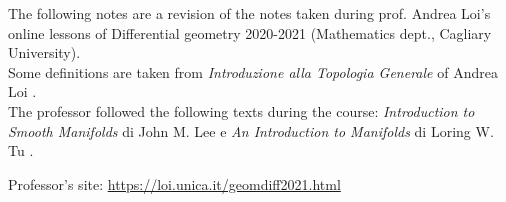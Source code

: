 The following notes are a revision of the notes taken during prof. Andrea Loi's online lessons of Differential geometry 2020-2021 (Mathematics dept., Cagliary University). \\
Some definitions are taken from \textit{Introduzione alla Topologia Generale} of Andrea Loi \autocite{loi}. \\
The professor followed the following texts during the course: \textit{Introduction to Smooth Manifolds} di John M. Lee \cite{lee} e \textit{An Introduction to Manifolds} di Loring W. Tu \cite{tu}.

Professor's site: \url{https://loi.unica.it/geomdiff2021.html}